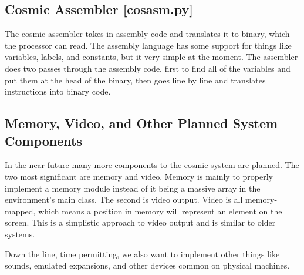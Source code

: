\documentclass[conference]{IEEEtran}
\begin{document}
\subsection{Cosmic Assembler [cosasm.py]}

The cosmic assembler takes in assembly code and translates it to binary, which the processor can read. The assembly language has some support for things like variables, labels, and constants, but it very simple at the moment. The assembler does two passes through the assembly code, first to find all of the variables and put them at the head of the binary, then goes line by line and translates instructions into binary code.


\subsection{Memory, Video, and Other Planned System Components}
In the near future many more components to the cosmic system are planned. The two most significant are memory and video. Memory is mainly to properly implement a memory module instead of it being a massive array in the environment's main class. The second is video output. Video is all memory-mapped, which means a position in memory will represent an element on the screen. This is a simplistic approach to video output and is similar to older systems.

Down the line, time permitting, we also want to implement other things like sounds, emulated expansions, and other devices common on physical machines. 
\end{document}
